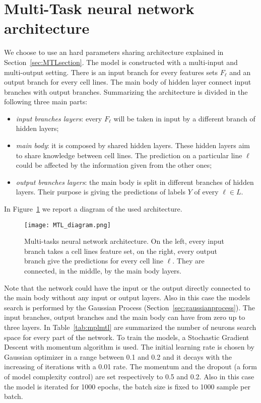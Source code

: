 \section{Multi-Task neural network architecture} \label{sec:mtlmlp}
We choose to use an hard parameters sharing architecture explained in Section~\ref{sec:MTLsection}. The model is constructed with a multi-input and multi-output setting. There is an input branch for every features sets $F_\ell$ and an output branch for every cell lines. The main body of hidden layer connect input branches with output branches. Summarizing the architecture is divided in the following three main parts:
\begin{itemize}
    \item \textit{input branches layers}: every $F_\ell$ will be taken in input by a different branch of hidden layers;
    \item \textit{main body}: it is composed by shared hidden layers. These hidden layers aim to share knowledge between cell lines. The prediction on a particular line $\ell$ could be affected by the information given from the other ones;
    \item \textit{output branches layers}: the main body is split in different branches of hidden layers. Their purpose is giving the predictions of labels $Y$ of every $\ell \in L$.
\end{itemize}
In Figure~\ref{fig:MTL_arch_diagram} we report a diagram of the used architecture.
\begin{figure}[ht]
\centering
\texttt{[image: MTL\_diagram.png]}
\caption{Multi-tasks neural network architecture. On the left, every input branch takes a cell lines feature set, on the right, every output branch give the predictions for every cell line $\ell$. They are connected, in the middle, by the main body layers. } 
\label{fig:MTL_arch_diagram}
\end{figure}
Note that the network could have the input or the output directly connected to the main body without any input or output layers. 
Also in this case the models search is performed by the Gaussian Process
(Section~\ref{sec:gaussianprocess}). The input branches, output branches and
the main body can have from zero up to three layers. In Table~\ref{tab:mplmtl} are summarized the number of neurons search space for every part of the network. 
To train the models, a Stochastic Gradient Descent with momentum algorithm is used. The initial learning rate is chosen by Gaussian optimizer in a range between 0.1 and 0.2 and it decays with the increasing of iterations with a 0.01 rate. The momentum and the dropout (a form of model complexity control) are set respectively to 0.5 and 0.2. Also in this case the model is iterated for 1000 epochs, the batch size is fixed to 1000 sample per batch. 
